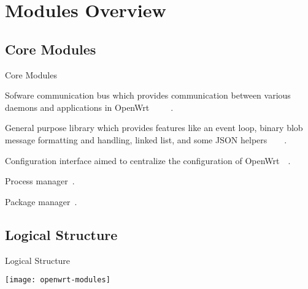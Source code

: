 \section{Modules Overview}

\subsection{Core Modules}
\begin{frame}{Core Modules}
    \begin{description}[<+(1)->]
        \item[ubus] Sofware communication bus which provides communication between various daemons and applications in OpenWrt~\cite{openwrt-ubus}~\cite{lutfi-ubus}~\cite{lutfi-ubox_ubus}~\cite{openwrt-rpc_guide}~\cite{openwrt-rpc_techref}.
        \item[ubox] General purpose library which provides features like an event loop, binary blob message formatting and handling, linked list, and some JSON helpers~\cite{openwrt-ubox}~\cite{openwrt-libubox}~\cite{lutfi-ubox_ubus}~\cite{openwrt-log}.
        \item[uci] Configuration interface aimed to centralize the configuration of OpenWrt~\cite{openwrt-uci}~\cite{openwrt-libuci}.
        \item[procd] Process manager~\cite{openwrt-procd}.
        \item[opkg] Package manager~\cite{openwrt-opkg}.
    \end{description}
\end{frame}

\subsection{Logical Structure}
\begin{frame}{Logical Structure}
    \centerline{\texttt{[image: openwrt-modules]}}
\end{frame}

